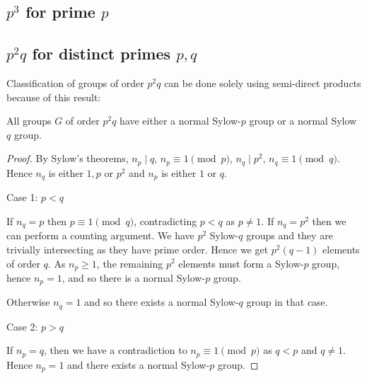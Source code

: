 \subsection{$p^3$ for prime $p$}
\label{$p^3$ for prime $p$}

\subsection{$p^2 q$ for distinct primes $p, q$}
\label{$p^2 q$ for distinct primes $p, q$}

Classification of groups of order $p^2 q$ can be done solely using semi-direct products because of this result:
\begin{lemma}\label{Groups of order $p^2 q$ have normal Sylow subgroup}
    All groups $G$ of order $p^2 q$ have either a normal Sylow-$p$ group or a normal Sylow $q$ group.
\end{lemma}
\begin{proof}
    By Sylow's theorems, $n_p \mid q$, $n_p \equiv 1 \pmod p$, $n_q \mid p^2$, $n_q \equiv 1 \pmod q$. Hence $n_q$ is either $1, p$ or $p^2$ and $n_p$ is either $1$ or $q$.
    
    Case 1: $p < q$
    
    If $n_q = p$ then $p \equiv 1 \pmod q$, contradicting $p < q$ as $p \neq 1$.
    If $n_q = p^2$ then we can perform a counting argument. We have $p^2$ Sylow-$q$ groups and they are trivially intersecting as they have prime order. Hence we get $p^2 (q - 1)$ elements of order $q$. As $n_p \geq 1$, the remaining $p^2$ elements must form a Sylow-$p$ group, hence $n_p = 1$, and so there is a normal Sylow-$p$ group.

    Otherwise $n_q = 1$ and so there exists a normal Sylow-$q$ group in that case.

    Case 2: $p > q$
    
    If $n_p = q$, then we have a contradiction to $n_p \equiv 1 \pmod p$ as $q < p$ and $q \neq 1$. Hence $n_p = 1$ and there exists a normal Sylow-$p$ group. 
\end{proof}


